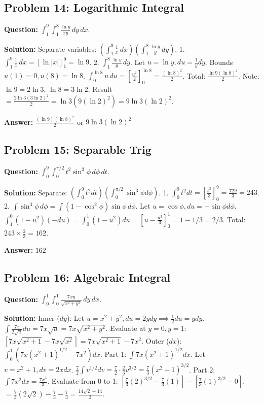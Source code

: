 \documentclass[11pt,a4paper]{article}
\begin{document}
\subsection*{Problem 14: Logarithmic Integral}
\textbf{Question:} $\int_1^9 \int_1^8 \frac{\ln y}{xy} \, dy \, dx$.

\textbf{Solution:}
Separate variables: $\left( \int_1^9 \frac{1}{x} \, dx \right) \left( \int_1^8 \frac{\ln y}{y} \, dy \right)$.
1. $\int_1^9 \frac{1}{x} \, dx = [\ln |x|]_1^9 = \ln 9$.
2. $\int_1^8 \frac{\ln y}{y} \, dy$. Let $u = \ln y, du = \frac{1}{y}dy$. Bounds $u(1)=0, u(8)=\ln 8$.
   $\int_0^{\ln 8} u \, du = [\frac{u^2}{2}]_0^{\ln 8} = \frac{(\ln 8)^2}{2}$.
Total: $\frac{\ln 9 (\ln 8)^2}{2}$.
Note: $\ln 9 = 2 \ln 3$, $\ln 8 = 3 \ln 2$.
Result $= \frac{2 \ln 3 (3 \ln 2)^2}{2} = \ln 3 (9 (\ln 2)^2) = 9 \ln 3 (\ln 2)^2$.

\textbf{Answer:} $\frac{(\ln 9)(\ln 8)^2}{2}$ or $9 \ln 3 (\ln 2)^2$

\subsection*{Problem 15: Separable Trig}
\textbf{Question:} $\int_0^9 \int_0^{\pi/2} t^2 \sin^3 \phi \, d\phi \, dt$.

\textbf{Solution:}
Separate: $(\int_0^9 t^2 dt)(\int_0^{\pi/2} \sin^3 \phi d\phi)$.
1. $\int_0^9 t^2 dt = [\frac{t^3}{3}]_0^9 = \frac{729}{3} = 243$.
2. $\int \sin^3 \phi \, d\phi = \int (1-\cos^2 \phi)\sin \phi \, d\phi$. Let $u=\cos \phi, du=-\sin \phi d\phi$.
   $\int_1^0 (1-u^2)(-du) = \int_0^1 (1-u^2) du = [u - \frac{u^3}{3}]_0^1 = 1 - 1/3 = 2/3$.
Total: $243 \times \frac{2}{3} = 162$.

\textbf{Answer:} $162$

\subsection*{Problem 16: Algebraic Integral}
\textbf{Question:} $\int_0^1 \int_0^1 \frac{7xy}{\sqrt{x^2+y^2}} \, dy \, dx$.

\textbf{Solution:}
Inner ($dy$): Let $u = x^2+y^2, du = 2y dy \implies \frac{1}{2}du = y dy$.
$\int \frac{7x}{2\sqrt{u}} du = 7x \sqrt{u} = 7x\sqrt{x^2+y^2}$.
Evaluate at $y=0, y=1$:
$[7x\sqrt{x^2+1} - 7x\sqrt{x^2}] = 7x\sqrt{x^2+1} - 7x^2$.
Outer ($dx$):
$\int_0^1 (7x(x^2+1)^{1/2} - 7x^2) dx$.
Part 1: $\int 7x(x^2+1)^{1/2} dx$. Let $v=x^2+1, dv=2x dx$. $\frac{7}{2} \int v^{1/2} dv = \frac{7}{2} \cdot \frac{2}{3} v^{3/2} = \frac{7}{3}(x^2+1)^{3/2}$.
Part 2: $\int 7x^2 dx = \frac{7x^3}{3}$.
Evaluate from 0 to 1:
$[ \frac{7}{3}(2)^{3/2} - \frac{7}{3}(1) ] - [ \frac{7}{3}(1)^{3/2} - 0 ]$.
$= \frac{7}{3}(2\sqrt{2}) - \frac{7}{3} - \frac{7}{3} = \frac{14\sqrt{2} - 14}{3}$.
\end{document}
